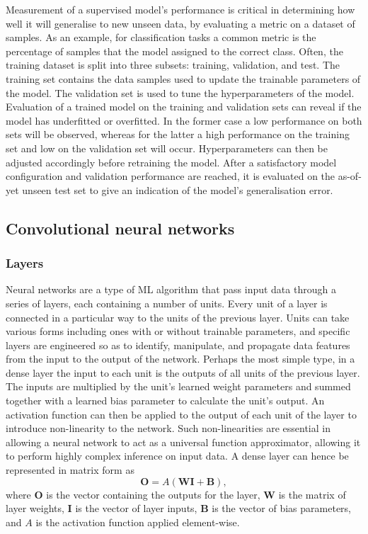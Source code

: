 \documentclass[12pt]{article}
\begin{document}
Measurement of a supervised model's performance is critical in determining how well it will generalise to new unseen data, by evaluating a metric on a dataset of samples. As an example, for classification tasks a common metric is the percentage of samples that the model assigned to the correct class. Often, the training dataset is split into three subsets: training, validation, and test. The training set contains the data samples used to update the trainable parameters of the model. The validation set is used to tune the hyperparameters of the model. Evaluation of a trained model on the training and validation sets can reveal if the model has underfitted or overfitted. In the former case a low performance on both sets will be observed, whereas for the latter a high performance on the training set and low on the validation set will occur. Hyperparameters can then be adjusted accordingly before retraining the model. After a satisfactory model configuration and validation performance are reached, it is evaluated on the as-of-yet unseen test set to give an indication of the model's generalisation error.

\subsection{Convolutional neural networks}
\subsubsection{Layers}
Neural networks are a type of ML algorithm that pass input data through a series of layers, each containing a number of units. Every unit of a layer is connected in a particular way to the units of the previous layer. Units can take various forms including ones with or without trainable parameters, and specific layers are engineered so as to identify, manipulate, and propagate data features from the input to the output of the network. Perhaps the most simple type, in a dense layer the input to each unit is the outputs of all units of the previous layer. The inputs are multiplied by the unit's learned weight parameters and summed together with a learned bias parameter to calculate the unit's output. An activation function can then be applied to the output of each unit of the layer to introduce non-linearity to the network. Such non-linearities are essential in allowing a neural network to act as a universal function approximator, allowing it to perform highly complex inference on input data. A dense layer can hence be represented in matrix form as
\begin{equation}
\bm{O}=A(\bm{W}\bm{I}+\bm{B}),
\end{equation}
where $\bm{O}$ is the vector containing the outputs for the layer, $\bm{W}$ is the matrix of layer weights, $\bm{I}$ is the vector of layer inputs, $\bm{B}$ is the vector of bias parameters, and $A$ is the activation function applied element-wise.
\end{document}
